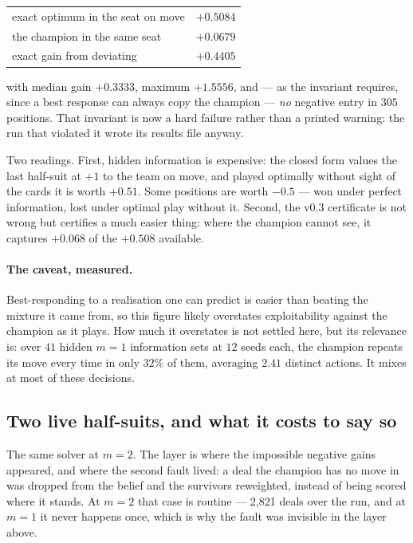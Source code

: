 \documentclass[11pt,letterpaper]{article}
\begin{document}
\begin{center}
\begin{tabular}{lr}
\toprule
exact optimum in the seat on move & $+0.5084$ \\
the champion in the same seat & $+0.0679$ \\
\midrule
exact gain from deviating & $\mathbf{+0.4405}$ \\
\bottomrule
\end{tabular}
\end{center}

with median gain $+0.3333$, maximum $+1.5556$, and --- as the invariant
requires, since a best response can always copy the champion --- \emph{no}
negative entry in $305$ positions. That invariant is now a hard
failure rather than a printed warning: the run that violated it wrote its
results file anyway.

Two readings. First, hidden information is expensive: the closed form values
the last half-suit at $+1$ to the team on move, and played optimally without
sight of the cards it is worth $+0.51$. Some positions are worth $-0.5$ ---
won under perfect information, lost under optimal play without it. Second, the
v0.3 certificate is not wrong but certifies a much easier thing: where the
champion cannot see, it captures $+0.068$ of the $+0.508$ available.

\paragraph{The caveat, measured.} Best-responding to a realisation one can
predict is easier than beating the mixture it came from, so this figure likely
overstates exploitability against the champion as it plays. How much it
overstates is not settled here, but its relevance is: over $41$ hidden $m = 1$
information sets at $12$ seeds each, the champion repeats its move every time
in only $32\%$ of them, averaging $2.41$ distinct actions. It mixes at most of
these decisions.

\subsection{Two live half-suits, and what it costs to say so}
\label{sec:iim2}

The same solver at $m = 2$. The layer is where the impossible negative gains
appeared, and where the second fault lived: a deal the champion has no move in
was dropped from the belief and the survivors reweighted, instead of being
scored where it stands. At $m = 2$ that case is routine --- 2,821 deals over
the run, and at $m = 1$ it never happens once, which is why the fault was
invisible in the layer above.
\end{document}
